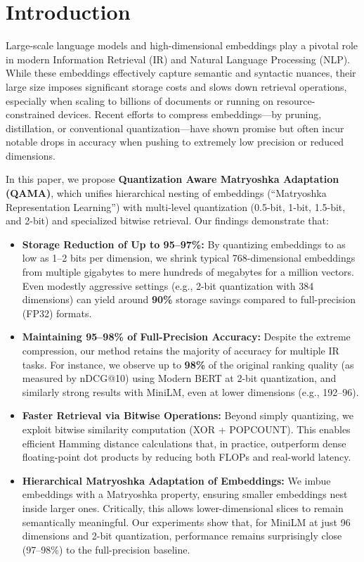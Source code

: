 \section{Introduction}

Large-scale language models and high-dimensional embeddings play a pivotal role in modern Information Retrieval (IR) and Natural Language Processing (NLP). While these embeddings effectively capture semantic and syntactic nuances, their large size imposes significant storage costs and slows down retrieval operations, especially when scaling to billions of documents or running on resource-constrained devices. Recent efforts to compress embeddings—by pruning, distillation, or conventional quantization—have shown promise but often incur notable drops in accuracy when pushing to extremely low precision or reduced dimensions.

In this paper, we propose \textbf{Quantization Aware Matryoshka Adaptation (QAMA)}, which unifies hierarchical nesting of embeddings (“Matryoshka Representation Learning”) with multi-level quantization (0.5-bit, 1-bit, 1.5-bit, and 2-bit) and specialized bitwise retrieval. Our findings demonstrate that:

\begin{itemize}
    \item \textbf{Storage Reduction of Up to 95--97\%:} By quantizing embeddings to as low as 1--2 bits per dimension, we shrink typical 768-dimensional embeddings from multiple gigabytes to mere hundreds of megabytes for a million vectors. Even modestly aggressive settings (e.g., 2-bit quantization with 384 dimensions) can yield around \textbf{90\%} storage savings compared to full-precision (FP32) formats.
    \item \textbf{Maintaining 95--98\% of Full-Precision Accuracy:} Despite the extreme compression, our method retains the majority of accuracy for multiple IR tasks. For instance, we observe up to \textbf{98\%} of the original ranking quality (as measured by nDCG@10) using Modern BERT at 2-bit quantization, and similarly strong results with MiniLM, even at lower dimensions (e.g., 192–96).
    \item \textbf{Faster Retrieval via Bitwise Operations:} Beyond simply quantizing, we exploit bitwise similarity computation (XOR + POPCOUNT). This enables efficient Hamming distance calculations that, in practice, outperform dense floating-point dot products by reducing both FLOPs and real-world latency. 
    \item \textbf{Hierarchical Matryoshka Adaptation of Embeddings:} We imbue embeddings with a Matryoshka property, ensuring smaller embeddings nest inside larger ones. Critically, this allows lower-dimensional slices to remain semantically meaningful. Our experiments show that, for MiniLM at just 96 dimensions and 2-bit quantization, performance remains surprisingly close (97--98\%) to the full-precision baseline.
\end{itemize}

